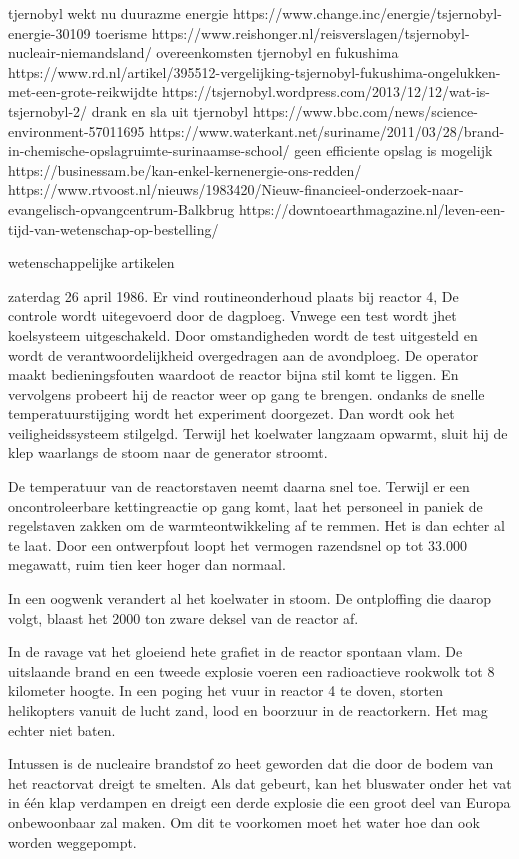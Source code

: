 tjernobyl wekt nu duurazme energie
https://www.change.inc/energie/tsjernobyl-energie-30109
toerisme
https://www.reishonger.nl/reisverslagen/tsjernobyl-nucleair-niemandsland/
overeenkomsten tjernobyl en fukushima
https://www.rd.nl/artikel/395512-vergelijking-tsjernobyl-fukushima-ongelukken-met-een-grote-reikwijdte
https://tsjernobyl.wordpress.com/2013/12/12/wat-is-tsjernobyl-2/
drank en sla uit tjernobyl
https://www.bbc.com/news/science-environment-57011695
https://www.waterkant.net/suriname/2011/03/28/brand-in-chemische-opslagruimte-surinaamse-school/
geen efficiente opslag is mogelijk
https://businessam.be/kan-enkel-kernenergie-ons-redden/
https://www.rtvoost.nl/nieuws/1983420/Nieuw-financieel-onderzoek-naar-evangelisch-opvangcentrum-Balkbrug
https://downtoearthmagazine.nl/leven-een-tijd-van-wetenschap-op-bestelling/

wetenschappelijke artikelen

zaterdag 26 april 1986. Er vind routineonderhoud plaats bij reactor 4, De controle wordt uitegevoerd door de dagploeg. Vnwege een test wordt jhet koelsysteem uitgeschakeld. Door omstandigheden wordt de test uitgesteld en wordt de verantwoordelijkheid overgedragen aan de avondploeg.
De operator maakt bedieningsfouten waardoot de reactor bijna stil komt te liggen. En vervolgens probeert hij de reactor weer op gang te brengen. ondanks de snelle temperatuurstijging wordt het experiment doorgezet. Dan wordt ook het veiligheidssysteem stilgelgd. Terwijl het koelwater langzaam opwarmt, sluit hij de klep waarlangs de stoom naar de generator stroomt.

De temperatuur van de reactorstaven neemt daarna snel toe. Terwijl er een oncontroleerbare kettingreactie op gang komt, laat het personeel in paniek de regelstaven zakken om de warmteontwikkeling af te remmen. Het is dan echter al te laat. Door een ontwerpfout loopt het vermogen razendsnel op tot 33.000 megawatt, ruim tien keer hoger dan normaal.

In een oogwenk verandert al het koelwater in stoom. De ontploffing die daarop volgt, blaast het 2000 ton zware deksel van de reactor af.

In de ravage vat het gloeiend hete grafiet in de reactor spontaan vlam. De uitslaande brand en een tweede explosie voeren een radioactieve rookwolk tot 8 kilometer hoogte.
In een poging het vuur in reactor 4 te doven, storten helikopters vanuit de lucht zand, lood en boorzuur in de reactorkern. Het mag echter niet baten.

Intussen is de nucleaire brandstof zo heet geworden dat die door de bodem van het reactorvat dreigt te smelten. Als dat gebeurt, kan het bluswater onder het vat in één klap verdampen en dreigt een derde explosie die een groot deel van Europa onbewoonbaar zal maken. Om dit te voorkomen moet het water hoe dan ook worden weggepompt.

